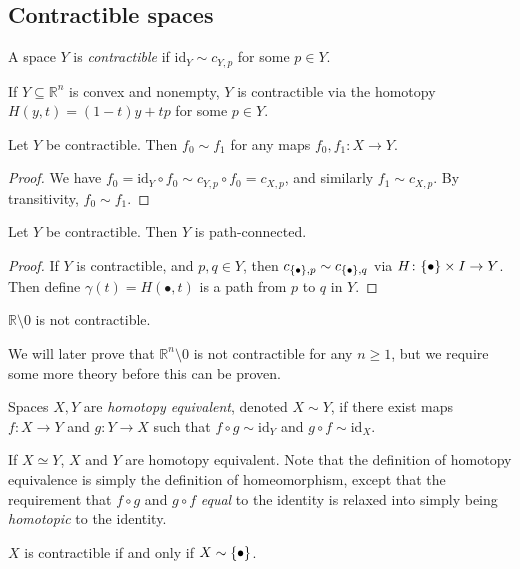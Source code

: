 \subsection{Contractible spaces}
\begin{definition}
	A space \( Y \) is \emph{contractible} if \( \mathrm{id}_Y \sim c_{Y,p} \) for some \( p \in Y \).
\end{definition}
\begin{example}
	If \( Y \subseteq \mathbb R^n \) is convex and nonempty, \( Y \) is contractible via the homotopy \( H(y,t) = (1-t)y + tp \) for some \( p \in Y \).
\end{example}
\begin{proposition}
	Let \( Y \) be contractible.
	Then \( f_0 \sim f_1 \) for any maps \( f_0, f_1 \colon X \to Y \).
\end{proposition}
\begin{proof}
	We have \( f_0 = \mathrm{id}_Y \circ f_0 \sim c_{Y,p} \circ f_0 = c_{X,p} \), and similarly \( f_1 \sim c_{X,p} \).
	By transitivity, \( f_0 \sim f_1 \).
\end{proof}
\begin{corollary}
	Let \( Y \) be contractible.
	Then \( Y \) is path-connected.
\end{corollary}
\begin{proof}
	If \( Y \) is contractible, and \( p, q \in Y \), then \( c_{\qty{\bullet},p} \sim c_{\qty{\bullet},q} \) via \( H \colon \qty{\bullet} \times I \to Y \).
	Then define \( \gamma(t) = H(\bullet,t) \) is a path from \( p \) to \( q \) in \( Y \).
\end{proof}
\begin{example}
	\( \mathbb R \setminus \qty{0} \) is not contractible.
\end{example}
We will later prove that \( \mathbb R^n \setminus \qty{0} \) is not contractible for any \( n \geq 1 \), but we require some more theory before this can be proven.
\begin{definition}
	Spaces \( X, Y \) are \emph{homotopy equivalent}, denoted \( X \sim Y \), if there exist maps \( f \colon X \to Y \) and \( g \colon Y \to X \) such that \( f \circ g \sim \mathrm{id}_Y \) and \( g \circ f \sim \mathrm{id}_X \).
\end{definition}
\begin{example}
	If \( X \simeq Y \), \( X \) and \( Y \) are homotopy equivalent.
	Note that the definition of homotopy equivalence is simply the definition of homeomorphism, except that the requirement that \( f \circ g \) and \( g \circ f \) \emph{equal} to the identity is relaxed into simply being \emph{homotopic} to the identity.
\end{example}
\begin{proposition}
	\( X \) is contractible if and only if \( X \sim \qty{\bullet} \).
\end{proposition}
